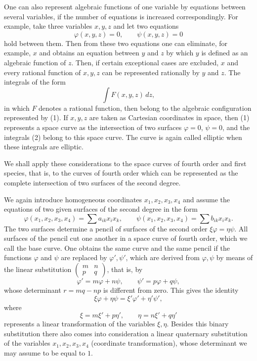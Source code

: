 \documentclass[11pt]{article}
\begin{document}
One can also represent algebraic functions of one variable by equations between several variables, if the number of equations is increased correspondingly. For example, take three variables $x,y,z$ and let two equations
\begin{equation}
\varphi(x,y,z)=0,\qquad \psi(x,y,z)=0
\tag{1}
\end{equation}
hold between them. Then from these two equations one can eliminate, for example, $x$ and obtains an equation between $y$ and $z$ by which $y$ is defined as an algebraic function of $z$. Then, if certain exceptional cases are excluded, $x$ and every rational function of $x,y,z$ can be represented rationally by $y$ and $z$. The integrals of the form
\begin{equation}
\int F(x,y,z)\,dz,
\tag{2}
\end{equation}
in which $F$ denotes a rational function, then belong to the algebraic configuration represented by (1). If $x,y,z$ are taken as Cartesian coordinates in space, then (1) represents a space curve as the intersection of two surfaces $\varphi=0$, $\psi=0$, and the integrals (2) belong to this space curve. The curve is again called elliptic when these integrals are elliptic.

We shall apply these considerations to the space curves of fourth order and first species, that is, to the curves of fourth order which can be represented as the complete intersection of two surfaces of the second degree.

We again introduce homogeneous coordinates $x_1,x_2,x_3,x_4$ and assume the equations of two given surfaces of the second degree in the form
\begin{equation}
\varphi(x_1,x_2,x_3,x_4)=\sum a_{ik}x_i x_k,\qquad
\psi(x_1,x_2,x_3,x_4)=\sum b_{ik}x_i x_k.
\tag{3}
\end{equation}
The two surfaces determine a pencil of surfaces of the second order $\xi\varphi=\eta\psi$. All surfaces of the pencil cut one another in a space curve of fourth order, which we call the base curve. One obtains the same curve and the same pencil if the functions $\varphi$ and $\psi$ are replaced by $\varphi',\psi'$, which are derived from $\varphi,\psi$ by means of the linear substitution $\begin{pmatrix}m&n\\ p&q\end{pmatrix}$, that is, by
\begin{equation}
\varphi'=m\varphi+n\psi,\qquad
\psi'=p\varphi+q\psi,
\tag{4}
\end{equation}
whose determinant $r=mq-np$ is different from zero. This gives the identity
\begin{equation}
\xi\varphi+\eta\psi=\xi'\varphi'+\eta'\psi',
\tag{5}
\end{equation}
where
\begin{equation}
\xi=m\xi'+p\eta',\qquad \eta=n\xi'+q\eta'
\tag{6}
\end{equation}
represents a linear transformation of the variables $\xi,\eta$. Besides this binary substitution there also comes into consideration a linear quaternary substitution of the variables $x_1,x_2,x_3,x_4$ (coordinate transformation), whose determinant we may assume to be equal to $1$.
\end{document}
